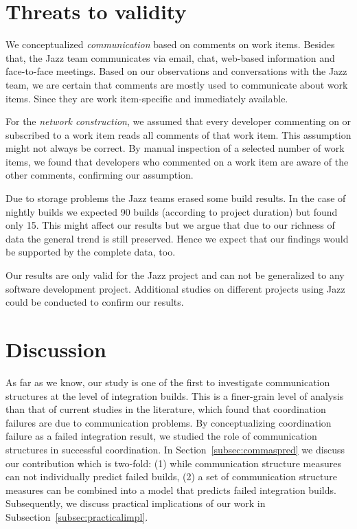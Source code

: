 \section{Threats to validity}
We conceptualized \emph{communication} based on comments on work items. Besides
that, the Jazz team communicates via email, chat, web-based information and
face-to-face meetings. Based on our observations and conversations with the Jazz
team, we are certain that comments are mostly used to communicate about work
items. Since they are work item-specific and immediately available.

For the \emph{network construction}, we assumed that every developer commenting
on or subscribed to a work item reads all comments of that work item. This
assumption might not always be correct. By manual inspection of a selected number
of work items, we found that developers who commented on a work item are aware of
the other comments, confirming our assumption.

Due to storage problems the Jazz teams erased some build results. In the case of
nightly builds we expected 90 builds (according to project duration) but found
only 15. This might affect our results but we argue that due to our richness of
data the general trend is still preserved. Hence we expect that our findings
would be supported by the complete data, too.

Our results are only valid for the Jazz project and can not be generalized to
any software development project. Additional studies on different projects
using Jazz could be conducted to confirm our results.



\section{Discussion}
\label{sec:discussion}
As far as we know, our study is one of the first to investigate communication
structures at the level of integration builds. This is a finer-grain level of
analysis than that of current studies in the literature, which found that
coordination failures are due to communication problems. By conceptualizing
coordination failure as a failed integration result, we studied the role of
communication structures in successful coordination. In
Section~\ref{subsec:commaspred} we discuss our contribution which is two-fold:
(1) while communication structure measures can not individually predict failed
builds, (2) a set of communication structure measures can be combined into a
model that predicts failed integration builds. Subsequently, we discuss practical
implications of our work in Subsection~\ref{subsec:practicalimpl}.

